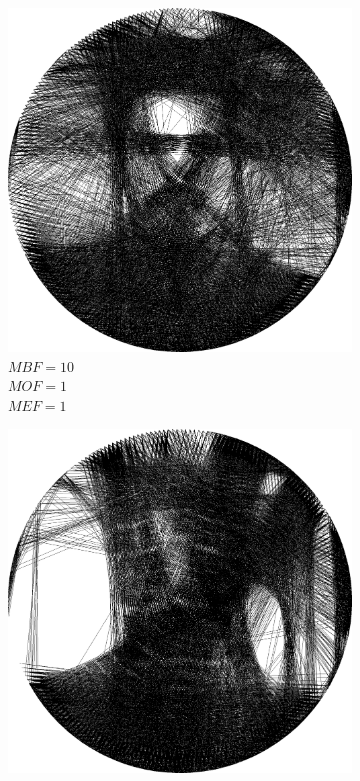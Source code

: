 \documentclass[a4paper, 12pt, polish, twoside]{extreport}
\begin{document}
\begin{figure}[H]
\begin{subfigure}{0.32\textwidth}
        \includegraphics[width = \textwidth]{img/4-mine/taco-thread/taco_e_i3000_c20_inv0_bg10_obj1_ed1.png}
        \caption{\(MBF = 10\) \\ \(MOF = 1\) \\ \(MEF = 1\)}
        \label{mine-param-taco-thread-d}
    \end{subfigure}
    \begin{subfigure}{0.32\textwidth}
        \centering
        \includegraphics[width = \textwidth]{img/4-mine/taco-thread/taco_e_i3000_c20_inv0_bg1_obj10_ed1.png}

\end{subfigure}
\end{figure}
\end{document}
